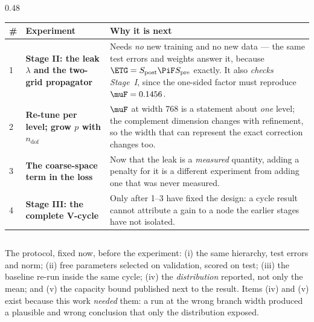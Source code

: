 \begin{columns}[T]
\begin{column}{0.48\textwidth}
{\scriptsize
\begin{tabular}{@{}p{0.5cm}p{4.3cm}p{7.4cm}@{}}
\toprule
\# & Experiment & Why it is next \\
\midrule
1 & \textbf{Stage II: the leak $\lambda$ and the two-grid propagator} &
Needs \emph{no} new training and no new data --- the same test errors and weights answer
it, because $\ETG=S_{\mathrm{post}}\PiF S_{\mathrm{pre}}$ exactly. It also \emph{checks
Stage~I}, since the one-sided factor must reproduce $\muF=0.1456$. \\[3pt]
2 & \textbf{Re-tune per level; grow $p$ with $n_{\text{dof}}$} &
$\muF$ at width $768$ is a statement about \emph{one} level; the complement dimension
changes with refinement, so the width that can represent the exact correction changes too. \\[3pt]
3 & \textbf{The coarse-space term in the loss} &
Now that the leak is a \emph{measured} quantity, adding a penalty for it is a different
experiment from adding one that was never measured. \\[3pt]
4 & \textbf{Stage III: the complete V-cycle} &
Only after 1--3 have fixed the design: a cycle result cannot attribute a gain to a node the
earlier stages have not isolated. \\
\bottomrule
\end{tabular}}
\end{column}
\end{columns}

\vspace{-1mm}
\alert{The protocol, fixed now, before the experiment:} (i) the same hierarchy, test errors
and norm; (ii) free parameters selected on validation, scored on test; (iii) the baseline
re-run inside the same cycle; (iv) the \emph{distribution} reported, not only the mean; and
(v) the capacity bound published next to the result. Items (iv) and (v) exist because this
work \emph{needed} them: a run at the wrong branch width produced a plausible and wrong
conclusion that only the distribution exposed.
